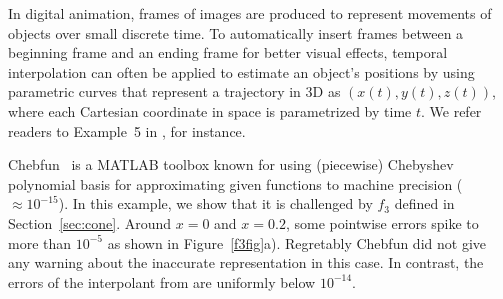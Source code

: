 In digital animation, frames of images are produced to represent movements of
objects over small discrete time. To automatically insert frames between a
beginning frame and an ending frame for better visual effects, temporal
interpolation can often be applied to estimate an object's positions by using
parametric curves that represent a trajectory in 3D as $(x(t), y(t), z(t))$,
where each Cartesian coordinate in space is parametrized by time $t$. We refer
readers to Example~5 in \cite{Din15a}, for instance.


\begin{exmp}
Chebfun~\cite{TrefEtal15a} is a MATLAB toolbox known for using (piecewise)
Chebyshev polynomial basis for approximating given functions to machine
precision ($\approx 10^{-15}$). In this example, we show that it is challenged
by $f_3$ defined in Section~\ref{sec:cone}. Around $x=0$ and $x=0.2$, some
pointwise errors spike to more than $10^{-5}$ as shown in Figure~\ref{f3fig}a).
Regretably Chebfun did not give any warning about the inaccurate representation
in this case. In contrast, the errors of the interpolant from \funappxg{} are
uniformly below $10^{-14}$.


\end{exmp}
